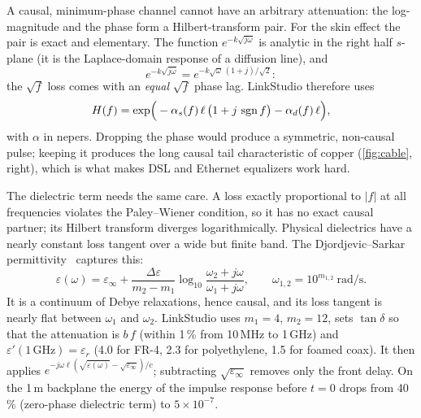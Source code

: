 \begin{keypoint}
A causal, minimum-phase channel cannot have an arbitrary attenuation: the log-magnitude and the
phase form a Hilbert-transform pair. For the skin effect the pair is exact and elementary. The
function $e^{-k\sqrt{j\omega}}$ is analytic in the right half $s$-plane (it is the
Laplace-domain response of a diffusion line), and
\[
  e^{-k\sqrt{j\omega}}=e^{-k\sqrt{\omega}\,(1+j)/\sqrt2}:
\]
the $\sqrt f$ loss comes with an \emph{equal} $\sqrt f$ phase lag. LinkStudio therefore uses
\begin{equation}
  H(f)=\exp\!\Big(-\alpha_s(f)\,\ell\,\big(1+j\,\operatorname{sgn} f\big)-\alpha_d(f)\,\ell\Big),
\end{equation}
with $\alpha$ in nepers. Dropping the phase would produce a symmetric, non-causal pulse;
keeping it produces the long causal tail characteristic of copper (\cref{fig:cable}, right),
which is what makes DSL and Ethernet equalizers work hard.

The dielectric term needs the same care. A loss exactly proportional to $|f|$ at all frequencies
violates the Paley--Wiener condition, so it has no exact causal partner; its Hilbert transform
diverges logarithmically. Physical dielectrics have a nearly constant loss tangent over a wide but
finite band. The Djordjevic--Sarkar permittivity~\cite{djordjevic2001} captures this:
\[
  \varepsilon(\omega)=\varepsilon_\infty+\frac{\Delta\varepsilon}{m_2-m_1}\log_{10}\frac{\omega_2+j\omega}{\omega_1+j\omega},
  \qquad \omega_{1,2}=10^{m_{1,2}}\ \mathrm{rad/s}.
\]
It is a continuum of Debye relaxations, hence causal, and its loss tangent is nearly flat between
$\omega_1$ and $\omega_2$. LinkStudio uses $m_1=4$, $m_2=12$, sets $\tan\delta$ so that the
attenuation is $b\,f$ (within 1\,\% from 10\,MHz to 1\,GHz) and $\varepsilon'(1\,\mathrm{GHz})=\varepsilon_r$
(4.0 for FR-4, 2.3 for polyethylene, 1.5 for foamed coax). It then applies
$e^{-j\omega\ell(\sqrt{\varepsilon(\omega)}-\sqrt{\varepsilon_\infty})/c}$; subtracting
$\sqrt{\varepsilon_\infty}$ removes only the front delay. On the 1\,m backplane the energy of the
impulse response before $t=0$ drops from 40\,\% (zero-phase dielectric term) to $5\times10^{-7}$.
\end{keypoint}

